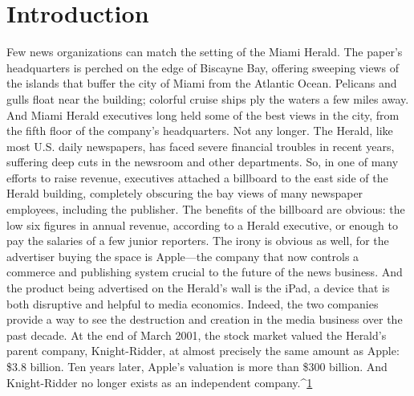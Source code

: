 \chapter{Introduction}
Few news organizations can match the setting of the Miami Herald. The paper's
headquarters is perched on the edge of Biscayne Bay, offering sweeping views of
the islands that buffer the city of Miami from the Atlantic Ocean. Pelicans and
gulls float near the building; colorful cruise ships ply the waters a few miles away.
And Miami Herald executives long held some of the best views in the city,
from the fifth floor of the company's headquarters.
Not any longer.
The Herald, like most U.S. daily newspapers, has faced severe financial troubles
in recent years, suffering deep cuts in the newsroom and other departments. So,
in one of many efforts to raise revenue, executives attached a billboard to the east
side of the Herald building, completely obscuring the bay views of many newspaper
employees, including the publisher.
The benefits of the billboard are obvious: the low six figures in annual revenue,
according to a Herald executive, or enough to pay the salaries of a few
junior reporters.
The irony is obvious as well, for the advertiser buying the space is Apple—the
company that now controls a commerce and publishing system crucial to the
future of the news business. And the product being advertised on the Herald's
wall is the iPad, a device that is both disruptive and helpful to media economics.
Indeed, the two companies provide a way to see the destruction and creation
in the media business over the past decade. At the end of March 2001, the stock
market valued the Herald's parent company, Knight-Ridder, at almost precisely
the same amount as Apple: \$3.8 billion.
Ten years later, Apple's valuation is more than \$300 billion. And Knight-Ridder
no longer exists as an independent company.^{\href{#endnotes-introduction}{1}}%

